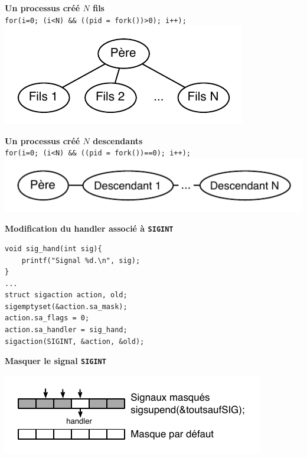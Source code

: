 \documentclass[french]{scrartcl}
\makeatletter
\newenvironment{BlockIndent}{\list{}%
    {\setlength{\leftmargin}{4mm}%
	 \setlength{\listparindent}{\parindent}%
     \setlength{\itemindent}{\listparindent}%
     \setlength{\topsep}{0pt}}%
     \item[]\relax}
{\endlist}
\newenvironment{figurehere}
  {\def\@captype{figure}}
  {}
\makeatother
\begin{document}
\begin{multicols}{3}
\pagebreak

\suppressfloats
{}

\textbf{Un processus créé $N$ fils}\\
\lstinline!for(i=0; (i<N) && ((pid = fork())>0); i++);!
\begin{figurehere}
	\includegraphics[scale=.5]{images/Nfils}
\end{figurehere}

\textbf{Un processus créé $N$ descendants}\\
\lstinline!for(i=0; (i<N) && ((pid = fork())==0); i++);!
\begin{figurehere}
    \includegraphics[scale=.5]{images/Ndesc}
\end{figurehere}

\vskip 5pt
\textbf{Modification du handler associé à \lstinline!SIGINT!}
\begin{BlockIndent}
\vspace{-5pt}\begin{lstlisting}
void sig_hand(int sig){
	printf("Signal %d.\n", sig);
}
...
struct sigaction action, old;
sigemptyset(&action.sa_mask);
action.sa_flags = 0;
action.sa_handler = sig_hand;
sigaction(SIGINT, &action, &old);
\end{lstlisting}\vspace{-5pt}
\end{BlockIndent}

\vskip 5pt
\textbf{Masquer le signal \lstinline!SIGINT!}

\begin{figurehere}
	\vspace{-5pt}
    \includegraphics[scale=.75]{images/bloquer-sig}
	\vspace{-7pt}
\end{figurehere}


\end{multicols}
\end{document}
